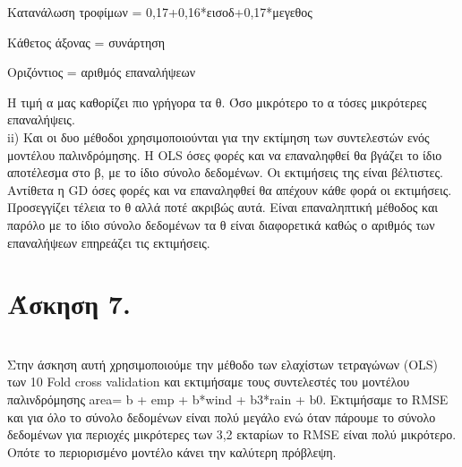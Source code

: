 \documentclass{article}
\begin{document}
	
	Κατανάλωση τροφίμων = 0,17+0,16*εισοδ+0,17*μεγεθος
	
	\vspace {0.5\baselineskip} 
	
	Κάθετος άξονας = συνάρτηση 
	
	\vspace {0.5\baselineskip} 
	
	Οριζόντιος = αριθμός επαναλήψεων 
	
	\vspace {0.5\baselineskip} 
	
	Η τιμή α μας καθορίζει πιο γρήγορα τα θ. Όσο μικρότερο το α τόσες μικρότερες επαναλήψεις.\\
	
	
	
	ii)  Και οι δυο μέθοδοι χρησιμοποιούνται για την εκτίμηση των συντελεστών ενός μοντέλου παλινδρόμησης. Η OLS όσες φορές και να επαναληφθεί θα βγάζει το ίδιο αποτέλεσμα στο β, με το ίδιο σύνολο δεδομένων. Οι εκτιμήσεις της είναι βέλτιστες. Αντίθετα η GD όσες φορές και να επαναληφθεί θα απέχουν κάθε φορά οι εκτιμήσεις. Προσεγγίζει τέλεια το θ αλλά ποτέ ακριβώς αυτά. Είναι επαναληπτική μέθοδος και παρόλο με το ίδιο σύνολο δεδομένων τα θ είναι διαφορετικά καθώς ο αριθμός των επαναλήψεων επηρεάζει τις εκτιμήσεις. \\
	
	
	\section{Άσκηση 7.} \\
	Στην άσκηση αυτή χρησιμοποιούμε την μέθοδο των ελαχίστων τετραγώνων (OLS) των 10 Fold cross validation και εκτιμήσαμε τους συντελεστές του μοντέλου παλινδρόμησης area= b + emp + b*wind + b3*rain + b0. Εκτιμήσαμε το RMSE και για όλο το σύνολο δεδομένων είναι πολύ μεγάλο ενώ όταν πάρουμε το σύνολο δεδομένων για περιοχές μικρότερες των 3,2 εκταρίων το RMSE είναι πολύ μικρότερο. Οπότε το περιορισμένο μοντέλο κάνει την καλύτερη πρόβλεψη.
	
\end{document}

